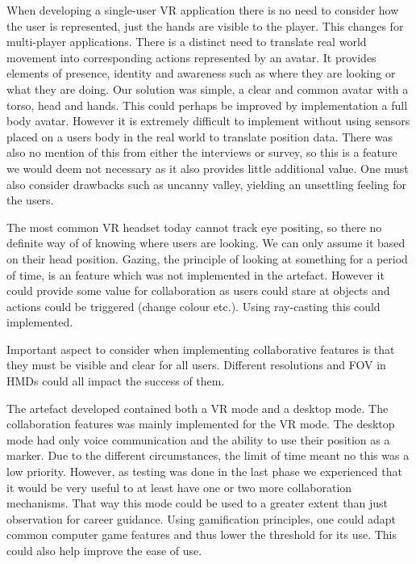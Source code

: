 When developing a single-user VR application there is no need to consider how the user is represented, just the hands are visible to the player. This changes for multi-player applications. There is a distinct need to translate real world movement into corresponding actions represented by an avatar. It provides elements of presence, identity and awareness such as where they are looking or what they are doing. Our solution was simple, a clear and common avatar with a torso, head and hands. This could perhaps be improved by implementation a full body avatar. However it is extremely difficult to implement without using sensors placed on a users body in the real world to translate position data. There was also no mention of this from either the interviews or survey, so this is a feature we would deem not necessary as it also provides little additional value. One must also consider drawbacks such as uncanny valley, yielding an unsettling feeling for the users. 

The most common VR headset today cannot track eye positing, so there no definite way of of knowing where users are looking. We can only assume it based on their head position. Gazing, the principle of looking at something for a period of time, is an feature which was not implemented in the artefact. However it could provide some value for collaboration as users could stare at objects and actions could be triggered (change colour etc.). Using ray-casting this could implemented. 

Important aspect to consider when implementing collaborative features is that they must be visible and clear for all users. Different resolutions and FOV in HMDs could all impact the success of them. 


The artefact developed contained both a VR mode and a desktop mode. The collaboration features was mainly implemented for the VR mode.   
The desktop mode had only voice communication and the ability to use their position as a marker. Due to the different circumstances, the limit of time meant no this was a low priority. However, as testing was done in the last phase we experienced that it would be very useful to at least have  one or two more collaboration mechanisms. That way this mode could be used to a greater extent than just observation for career guidance. Using gamification principles, one could adapt common computer game features and thus lower the threshold for its use. This could also help improve the ease of use.  


